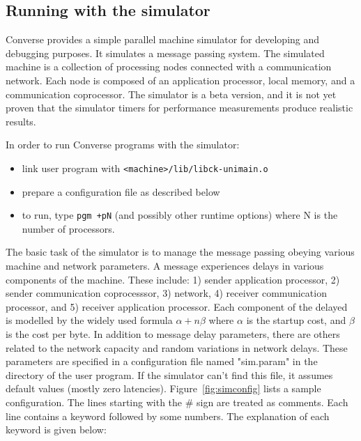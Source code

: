 \subsection[Running with the simulator]{Running with the simulator}

Converse provides a simple parallel machine simulator for developing
and debugging purposes. It simulates a message passing system. The
simulated machine is a collection of processing nodes connected with a
communication network. Each node is composed of an application
processor, local memory, and a communication coprocessor.  The
simulator is a beta version, and it is not yet proven that the
simulator timers for performance measurements produce realistic
results.

In order to run Converse programs with the simulator:
\begin{itemize}

\item link user program with \verb+<machine>/lib/libck-unimain.o+

\item prepare a configuration file as described below

\item to run, type \verb#pgm +pN# (and possibly other runtime options) where
   N is the number of processors.

\end{itemize}

The basic task of the simulator is to manage the message passing
obeying various machine and network parameters.  A message experiences
delays in various components of the machine. These include: 1) sender
application processor, 2) sender communication coprocesssor, 3)
network, 4) receiver communication processor, and 5) receiver
application processor.  Each component of the delayed is modelled by
the widely used formula $\alpha + n\beta$ where $\alpha$ is the
startup cost, and $\beta$ is the cost per byte.  In addition to
message delay parameters, there are others related to the network
capacity and random variations in network delays. These parameters are
specified in a configuration file named "sim.param" in the directory
of the user program. If the simulator can't find this file, it assumes
default values (mostly zero latencies).  Figure~\ref{fig:simconfig}
lists a sample configuration. The lines starting with the \# sign are
treated as comments. Each line contains a keyword followed by some
numbers. The explanation of each keyword is given below:

